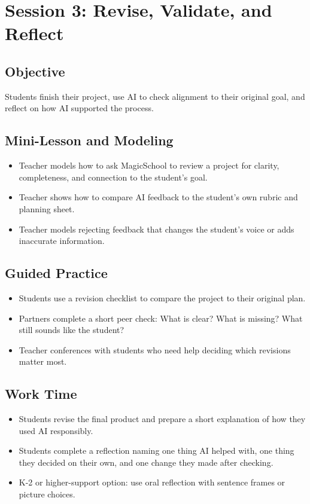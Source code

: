 \documentclass[11pt]{article}
\begin{document}
\section*{Session 3: Revise, Validate, and Reflect}
\subsection*{Objective}
Students finish their project, use AI to check alignment to their original goal, and reflect on how AI supported the process.

\subsection*{Mini-Lesson and Modeling}
\begin{itemize}
\item Teacher models how to ask MagicSchool to review a project for clarity, completeness, and connection to the student's goal.
\item Teacher shows how to compare AI feedback to the student's own rubric and planning sheet.
\item Teacher models rejecting feedback that changes the student's voice or adds inaccurate information.
\end{itemize}

\subsection*{Guided Practice}
\begin{itemize}
\item Students use a revision checklist to compare the project to their original plan.
\item Partners complete a short peer check: What is clear? What is missing? What still sounds like the student?
\item Teacher conferences with students who need help deciding which revisions matter most.
\end{itemize}

\subsection*{Work Time}
\begin{itemize}
\item Students revise the final product and prepare a short explanation of how they used AI responsibly.
\item Students complete a reflection naming one thing AI helped with, one thing they decided on their own, and one change they made after checking.
\item K-2 or higher-support option: use oral reflection with sentence frames or picture choices.
\end{itemize}
\end{document}
